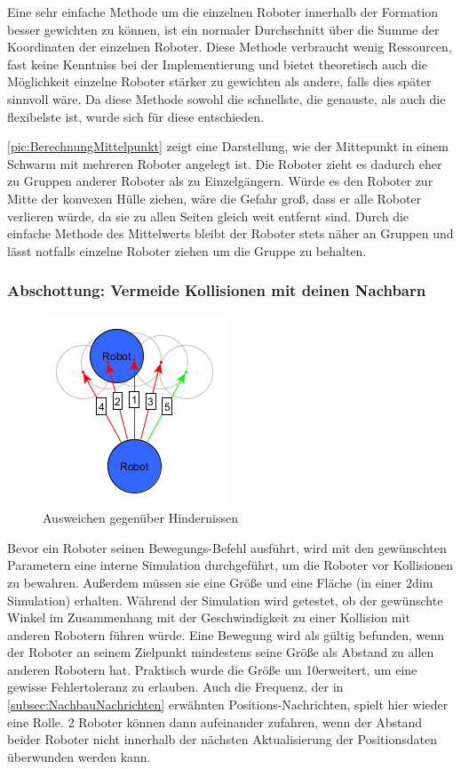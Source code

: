 Eine sehr einfache Methode um die einzelnen Roboter innerhalb der Formation besser gewichten zu können, ist ein normaler Durchschnitt über die Summe der Koordinaten der einzelnen Roboter. Diese Methode verbraucht wenig Ressourcen, fast keine Kenntniss bei der Implementierung und bietet theoretisch auch die Möglichkeit einzelne Roboter stärker zu gewichten als andere, falls dies später sinnvoll wäre. Da diese Methode sowohl die schnellste, die genauste, als auch die flexibelste ist, wurde sich für diese entschieden.

\autoref{pic:BerechnungMittelpunkt} zeigt eine Darstellung, wie der Mittepunkt in einem Schwarm mit mehreren Roboter angelegt ist.
Die Roboter zieht es dadurch eher zu Gruppen anderer Roboter als zu Einzelgängern. Würde es den Roboter zur Mitte der konvexen Hülle ziehen, wäre die Gefahr groß, dass er alle Roboter verlieren würde, da sie zu allen Seiten gleich weit entfernt sind. Durch die einfache Methode des Mittelwerts bleibt der Roboter stets näher an Gruppen und lässt notfalls einzelne Roboter ziehen um die Gruppe zu behalten.

\subsubsection*{Abschottung: Vermeide Kollisionen mit deinen Nachbarn}

\begin{figure}
	\includegraphics[width=\pictureWidthSmall,keepaspectratio]{graphics/AusweichenAlgorithmus.png}
	\caption{Ausweichen gegenüber Hindernissen}
	\label{pic:AusweichenAlgorithmus}
\end{figure}

Bevor ein Roboter seinen Bewegungs-Befehl ausführt, wird mit den gewünschten Parametern eine interne Simulation durchgeführt, um die Roboter vor Kollisionen zu bewahren. Außerdem müssen sie eine Größe und eine Fläche (in einer 2dim Simulation) erhalten. Während der Simulation wird getestet, ob der gewünschte Winkel im Zusammenhang mit der Geschwindigkeit zu einer Kollision mit anderen Robotern führen würde. Eine Bewegung wird als gültig befunden, wenn der Roboter an seinem Zielpunkt mindestens seine Größe als Abstand zu allen anderen Robotern hat. Praktisch wurde die Größe um 10\per erweitert, um eine gewisse Fehlertoleranz zu erlauben.
Auch die Frequenz, der in \autoref{subsec:NachbauNachrichten} erwähnten Positions-Nachrichten, spielt hier wieder eine Rolle. 2 Roboter können dann aufeinander zufahren, wenn der Abstand beider Roboter nicht innerhalb der nächsten Aktualisierung der Positionsdaten überwunden werden kann.

